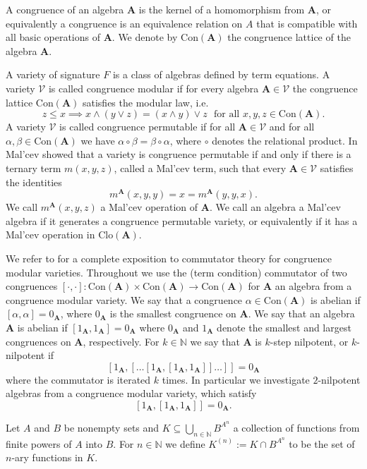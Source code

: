 \documentclass[12pt]{amsart}
\numberwithin{equation}{section}
\theoremstyle{plain}
\theoremstyle{definition}
\newcommand{\A}{\mathbf{A}}
\newcommand{\N}{\mathbb{N}}
\newcommand{\V}{\mathcal{V}}
\newcommand{\Clo}{\mathrm{Clo}}
\newcommand{\Con}{\mathrm{Con}}
\begin{document}
A congruence of an algebra $\A$ is the kernel of a homomorphism from $\A$, 
  or equivalently a congruence is an equivalence relation on $A$ 
  that is compatible with all basic operations of $\A$. 
We denote by $\Con(\A)$ the congruence lattice of the algebra $\A$.


A variety of signature $F$ is a class of algebras defined by term equations.
A variety $\mathcal{V}$ is called congruence modular if for every algebra $\A \in \V$
  the congruence lattice $\Con(\A)$ satisfies the modular law, i.e. 
  \[z \leq x \implies x \wedge (y  \vee z) = (x \wedge y) \vee z \,\, \text{ for all } x,y,z \in \Con(\A). \]
A variety $\mathcal{V}$ is called congruence permutable if for all $\A \in \mathcal{V}$ 
  and for all $\alpha, \beta \in \Con(\A)$ we have $\alpha \circ \beta = \beta \circ \alpha$,
  where $\circ$ denotes the relational product.
In \cite{Mal:GTAS} Mal'cev showed that a variety is congruence permutable if and only if
  there is a ternary term $m(x,y,z)$, called a Mal'cev term, such that every $\A \in \mathcal{V}$ satisfies the identities 
  \[m^\A(x,y,y) = x = m^\A(y,y,x). \]
We call $m^\A(x,y,z)$ a Mal'cev operation of $\A$.
We call an algebra a Mal'cev algebra if it generates a congruence permutable variety,
  or equivalently if it has a Mal'cev operation in $\Clo(\A)$.

We refer to \cite{FM:CTC} for a complete exposition to commutator theory for congruence modular varieties.
Throughout we use the (term condition) commutator of two congruences 
  $[ \cdot , \cdot ] \colon \Con(\A) \times \Con(\A) \rightarrow \Con(\A)$
  for $\A$ an algebra from a congruence modular variety.
We say that a congruence $\alpha \in \Con(\A)$ is abelian if $[\alpha, \alpha] = 0_\A$,
  where $0_\A$ is the smallest congruence on $\A$. 
We say that an algebra $\A$ is abelian if $[1_\A, 1_\A] = 0_\A$ 
  where $0_\A$ and $1_\A$ denote the smallest and largest congruences on $\A$, respectively.
For $k\in \N$ we say that $\A$ is $k$-step nilpotent, or $k$-nilpotent if 
  \[ [1_\A, [\dots [1_\A, [1_\A,1_\A]] \dots ]] = 0_\A\]
  where the commutator is iterated $k$ times.
In particular we investigate $2$-nilpotent algebras from a congruence modular variety, which satisfy
  \[ [1_\A, [1_\A,1_\A]] = 0_\A .\]

Let  $A$ and $B$ be nonempty sets and $K \subseteq \bigcup_{n \in \N} B^{A^n}$ 
  a collection of functions from finite powers of $A$ into $B$.
For $n \in \N$ we define $K^{(n)}:= K \cap B^{A^n}$ to be the set of $n$-ary functions in $K$.
\end{document}
